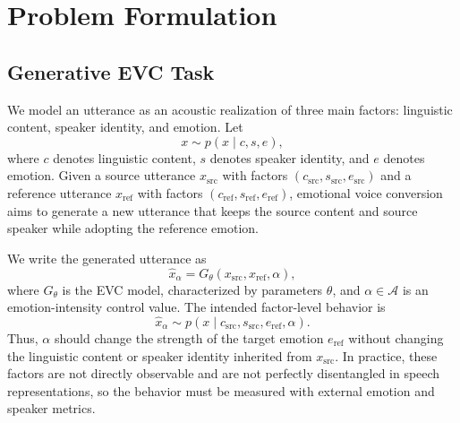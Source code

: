 \section{Problem Formulation}
\label{sec:problem-formulation}

\subsection{Generative EVC Task}
We model an utterance as an acoustic realization of three main factors: linguistic content, speaker identity, and emotion.
Let
\begin{equation}
x \sim p(x \mid c, s, e),
\end{equation}
where $c$ denotes linguistic content, $s$ denotes speaker identity, and $e$ denotes emotion.
Given a source utterance $x_{\mathrm{src}}$ with factors $(c_{\mathrm{src}},s_{\mathrm{src}},e_{\mathrm{src}})$ and a reference utterance $x_{\mathrm{ref}}$ with factors $(c_{\mathrm{ref}},s_{\mathrm{ref}},e_{\mathrm{ref}})$, emotional voice conversion aims to generate a new utterance that keeps the source content and source speaker while adopting the reference emotion.

We write the generated utterance as
\begin{equation}
\hat{x}_{\alpha}
=G_\theta(x_{\mathrm{src}},x_{\mathrm{ref}},\alpha),
\end{equation}
where $G_\theta$ is the EVC model, characterized by parameters $\theta$, and $\alpha \in \mathcal{A}$ is an emotion-intensity control value.
The intended factor-level behavior is
\begin{equation}
\hat{x}_{\alpha}
\sim p(x \mid c_{\mathrm{src}},s_{\mathrm{src}},e_{\mathrm{ref}},\alpha).
\end{equation}
Thus, $\alpha$ should change the strength of the target emotion $e_{\mathrm{ref}}$ without changing the linguistic content or speaker identity inherited from $x_{\mathrm{src}}$.
In practice, these factors are not directly observable and are not perfectly disentangled in speech representations, so the behavior must be measured with external emotion and speaker metrics.

